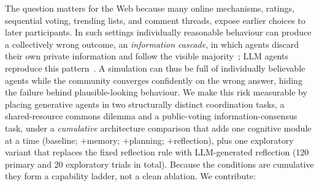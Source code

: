 \documentclass[runningheads]{llncs}
\begin{document}
The question matters for the Web because many online mechanisms, ratings, sequential
voting, trending lists, and comment threads, expose earlier choices to later participants.
In such settings individually reasonable behaviour can produce a collectively wrong
outcome, an \emph{information cascade}, in which agents discard their own private
information and follow the visible majority~\cite{bikhchandani1992theory}; LLM agents
reproduce this pattern~\cite{cho2025herd,jain2025social,zhong2025conformity}. A simulation
can thus be full of individually believable agents while the community converges
confidently on the wrong answer, hiding the failure behind plausible-looking behaviour. We
make this risk measurable by placing generative agents in two structurally distinct
coordination tasks, a shared-resource commons dilemma and a public-voting
information-consensus task, under a \emph{cumulative} architecture comparison that adds one
cognitive module at a time (baseline; $+$memory; $+$planning; $+$reflection), plus one
exploratory variant that replaces the fixed reflection rule with LLM-generated reflection
(120 primary and 20 exploratory trials in total). Because the conditions are cumulative
they form a capability ladder, not a clean ablation. We contribute:
\end{document}
